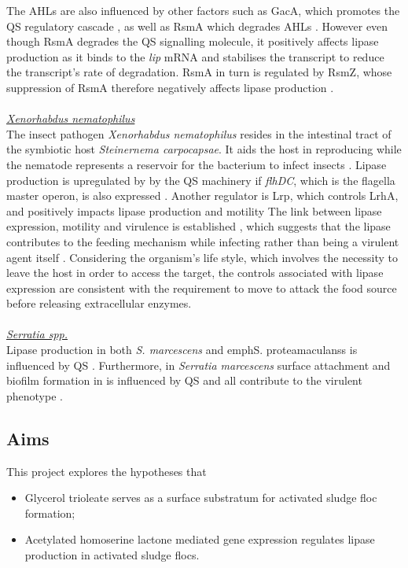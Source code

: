 \documentclass[11pt]{article}
\begin{document}
The AHLs are also influenced by other factors such as GacA, which promotes the QS regulatory cascade \cite{reimmann1997}, as well as RsmA which degrades AHLs \cite{pessi2001}. However even though RsmA degrades the QS signalling molecule, it positively affects lipase production as it binds to the \textit{lip} mRNA and stabilises the transcript to reduce the transcript's rate of degradation. RsmA in turn is regulated by RsmZ, whose suppression of RsmA therefore negatively affects lipase production \cite{heurlier2004}. 
\\
\\ \emph{\underline{Xenorhabdus nematophilus}} 
\\The insect pathogen \emph{Xenorhabdus nematophilus} resides in the intestinal tract of the symbiotic host \emph{Steinernema carpocapsae}. It aids the host in reproducing while the nematode represents a reservoir for the bacterium to infect insects \cite{herbert2007}. Lipase production is upregulated by  by the QS machinery \cite{dunphy_97} if \emph{flhDC}, which is the flagella master operon, is also expressed \cite{rosenau2000}. Another regulator is Lrp, which controls LrhA, and positively impacts lipase production and motility \cite{richards2008} 
The link between lipase expression, motility and virulence is established \cite{givaudan_00}, which suggests that the lipase contributes to the feeding mechanism while infecting rather than being a virulent agent itself \cite{richards2010}. Considering the organism's life style, which involves the necessity to leave the host in order to access the target, the controls associated with lipase expression are consistent with the requirement to move to attack the food source before releasing extracellular enzymes.
\\
\\ \emph{\underline{Serratia spp.}} 
\\Lipase production in both \emph{S. marcescens} and emph{S. proteamaculanss} is influenced by QS \cite{horng2002,shibatani2000,christensen_03}. Furthermore, in \emph{Serratia marcescens} surface attachment and biofilm formation in  is influenced by QS \cite{labbate2007} and all contribute to the virulent phenotype \cite{hejazi_97}.
\FloatBarrier
\subsection{Aims}

This project explores the hypotheses that 
\begin{itemize}
\item Glycerol trioleate serves as a surface substratum for activated sludge floc formation;
\item Acetylated homoserine lactone mediated gene expression regulates lipase production in activated sludge flocs.
\end{itemize}
\end{document}
